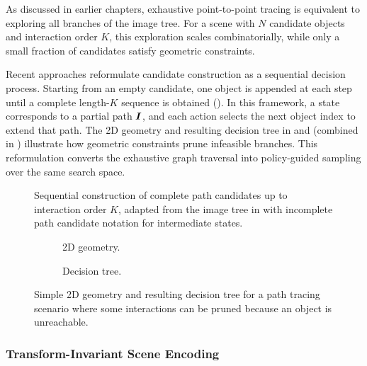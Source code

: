 As discussed in earlier chapters, exhaustive point-to-point tracing is equivalent to exploring all branches of the image tree. For a scene with $N$ candidate objects and interaction order $K$, this exploration scales combinatorially, while only a small fraction of candidates satisfy geometric constraints.

Recent approaches reformulate candidate construction as a sequential decision process. Starting from an empty candidate, one object is appended at each step until a complete length-$K$ sequence is obtained (). In this framework, a state corresponds to a partial path $\boldsymbol{I}$, and each action selects the next object index to extend that path. The 2D geometry and resulting decision tree in  and  (combined in ) illustrate how geometric constraints prune infeasible branches. This reformulation converts the exhaustive graph traversal into policy-guided sampling over the same search space.

\begin{figure}
  \centering
  \caption{Sequential construction of complete path candidates up to interaction order $K$, adapted from the image tree in  with incomplete path candidate notation for intermediate states.}
\end{figure}

\begin{figure}
  \centering
  \begin{subfigure}[b]{0.47\contentwidth}
    \caption{2D geometry.}
  \end{subfigure}
  \hfill
  \begin{subfigure}[b]{0.47\contentwidth}
    \caption{Decision tree.}
  \end{subfigure}
  \caption{Simple 2D geometry and resulting decision tree for a path tracing scenario where some interactions can be pruned because an object is unreachable.}
\end{figure}

\subsubsection{Transform-Invariant Scene Encoding}

